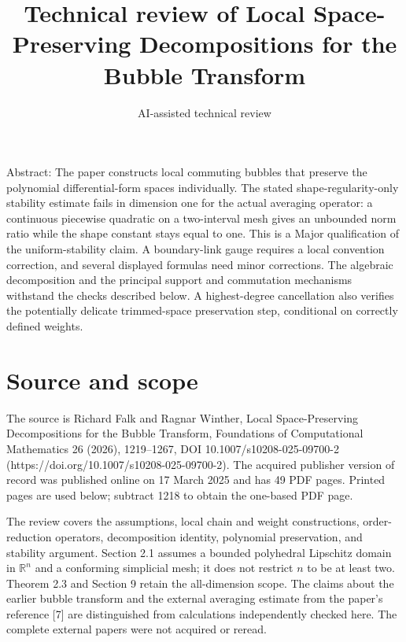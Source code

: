 \documentclass[10pt]{article}
\title{Technical review of
Local Space-Preserving Decompositions
for the Bubble Transform}
\author{AI-assisted technical review}
\date{}
\begin{document}
\maketitle
Abstract: The paper constructs local commuting bubbles that preserve the polynomial differential-form spaces individually. The stated shape-regularity-only stability estimate fails in dimension one for the actual averaging operator: a continuous piecewise quadratic on a two-interval mesh gives an unbounded norm ratio while the shape constant stays equal to one. This is a Major qualification of the uniform-stability claim. A boundary-link gauge requires a local convention correction, and several displayed formulas need minor corrections. The algebraic decomposition and the principal support and commutation mechanisms withstand the checks described below. A highest-degree cancellation also verifies the potentially delicate trimmed-space preservation step, conditional on correctly defined weights.\par
\section*{Source and scope}
The source is Richard Falk and Ragnar Winther, Local Space-Preserving Decompositions for the Bubble Transform, Foundations of Computational Mathematics 26 (2026), 1219–1267, DOI 10.1007/s10208-025-09700-2 (https://doi.org/10.1007/s10208-025-09700-2). The acquired publisher version of record was published online on 17 March 2025 and has 49 PDF pages. Printed pages are used below; subtract 1218 to obtain the one-based PDF page.\par
The review covers the assumptions, local chain and weight constructions, order-reduction operators, decomposition identity, polynomial preservation, and stability argument. Section 2.1 assumes a bounded polyhedral Lipschitz domain in \(\mathbb R^n\) and a conforming simplicial mesh; it does not restrict \(n\) to be at least two. Theorem 2.3 and Section 9 retain the all-dimension scope. The claims about the earlier bubble transform and the external averaging estimate from the paper’s reference [7] are distinguished from calculations independently checked here. The complete external papers were not acquired or reread.\par
\end{document}

